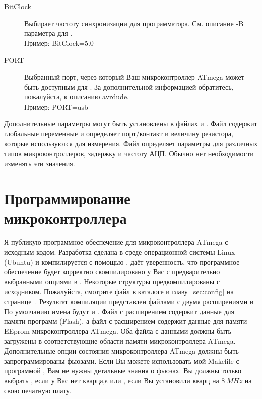 \begin{description}
  \item[BitClock] Выбирает частоту синхронизации для программатора. См. описание -B параметра для .\\
Пример: BitClock=5.0

  \item[PORT] Выбранный порт, через который Ваш микроконтроллер ATmega может быть доступным для . За 
дополнительной информацией обратитесь, пожалуйста, к описанию avrdude.\\
Пример: PORT=usb

\end{description}

Дополнительные параметры могут быть установлены в файлах  и .
Файл  содержит глобальные переменные и определяет порт/контакт и величину резистора,
которые используются для измерения. Файл  определяет параметры для различных типов микроконтроллеров, задержку и частоту АЦП. Обычно нет 
необходимости изменять эти значения.

\section{Программирование микроконтроллера}
Я публикую программное обеспечение для микроконтроллера ATmega с исходным кодом.
Разработка сделана в среде операционной системы Linux (Ubuntu) и компилируется с помощью .
 даёт уверенность, что программное обеспечение будет корректно скомпилировано
у Вас с предварительно выбранными опциями в .
Некоторые структуры предкомпилированы с исходником.
Пожалуйста, смотрите   файл в каталоге  
и главу~\ref{sec:config} на странице~\pageref{sec:config}.
Результат компиляции представлен файлами с двумя расширениями  и 
По умолчанию имена будут  и .
Файл с расширением  содержит данные для памяти программ (Flash), 
а файл с расширением  содержит данные для памяти EEprom  микроконтроллера ATmega.
Оба файла с данными должны быть загружены в соответствующие области памяти микроконтроллера ATmega.\\

Дополнительные опции состояния микроконтроллера ATmega должны быть запрограммированы фьюзами.
Если Вы можете использовать мой Makefile с программой  \cite{avrdude},
Вам не нужны детальные знания о фьюзах. 
Вы должны только выбрать  , если у Вас нет кварца,s
или  , если Вы установили кварц на \(8~MHz\) на свою печатную плату.


